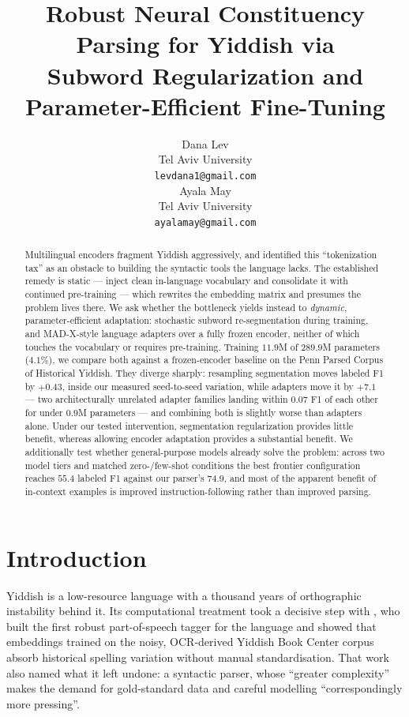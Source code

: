 \documentclass[11pt]{article}
\title{Robust Neural Constituency Parsing for Yiddish via \\
       Subword Regularization and Parameter-Efficient Fine-Tuning}
\author{Dana Lev \\
  Tel Aviv University \\
  \texttt{levdana1@gmail.com} \\\And
  Ayala May \\
  Tel Aviv University \\
  \texttt{ayalamay@gmail.com} \\}
\begin{document}
\maketitle

\begin{abstract}
Multilingual encoders fragment Yiddish aggressively, and \citet{kulick-etal-2022-part}
identified this ``tokenization tax'' as an obstacle to building the syntactic
tools the language lacks. The established remedy is static --- inject clean
in-language vocabulary and consolidate it with continued pre-training --- which
rewrites the embedding matrix and presumes the problem lives there. We ask whether
the bottleneck yields instead to \emph{dynamic}, parameter-efficient adaptation:
stochastic subword re-segmentation during training, and MAD-X-style language
adapters over a fully frozen encoder, neither of which touches the vocabulary or
requires pre-training. Training $11.9$M of $289.9$M parameters ($4.1\%$), we
compare both against a frozen-encoder baseline on the Penn Parsed Corpus of
Historical Yiddish. They diverge sharply: resampling segmentation moves labeled F1
by $+0.43$, inside our measured seed-to-seed variation, while adapters move it by
$+7.1$ --- two architecturally unrelated adapter families landing within $0.07$ F1
of each other for under $0.9$M parameters --- and combining both is slightly worse
than adapters alone. Under our tested intervention, segmentation regularization provides little benefit, whereas allowing encoder adaptation provides a substantial benefit. We additionally test whether
general-purpose models already solve the problem: across two model tiers and
matched zero-/few-shot conditions the best frontier configuration reaches $55.4$
labeled F1 against our parser's $74.9$, and most of the apparent benefit of
in-context examples is improved instruction-following rather than improved
parsing.
\end{abstract}

\section{Introduction}

Yiddish is a low-resource language with a thousand years of orthographic
instability behind it. Its computational treatment took a decisive step with
\citet{kulick-etal-2022-part}, who built the first robust part-of-speech tagger
for the language and showed that embeddings trained on the noisy, OCR-derived
Yiddish Book Center corpus absorb historical spelling variation without manual
standardisation. That work also named what it left undone: a syntactic parser,
whose ``greater complexity'' makes the demand for gold-standard data and careful
modelling ``correspondingly more pressing''.
\end{document}

